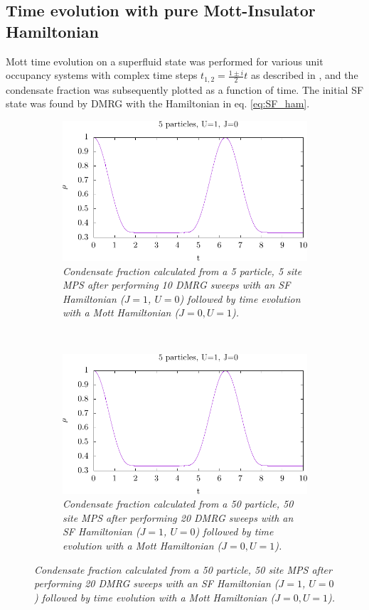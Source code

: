 \subsection{Time evolution with pure Mott-Insulator Hamiltonian}
Mott time evolution on a superfluid state was performed for various unit occupancy systems with complex time steps $t_{1,2}=\frac{1\pm i}{2}t$ as described in \cite{cmplx_t}, and the condensate fraction was subsequently plotted as a function of time. The initial SF state was found by DMRG with the Hamiltonian in eq. \ref{eq:SF_ham}.
\begin{figure}[h!]
    \centering
    \begin{subfigure}[t]{0.49\textwidth}
        \includegraphics[width=\textwidth]{Figures/TimeEvo5_U1_J0.pdf}
        \caption{\textit{Condensate fraction calculated from a 5 particle, 5 site MPS after performing 10 DMRG sweeps with an SF Hamiltonian ($J=1$, $U=0$) followed by time evolution with a Mott Hamiltonian ($J=0, U=1$).}}
        \label{fig:TimeEvo5_U1_J0}
    \end{subfigure}
    ~
    \begin{subfigure}[t]{0.49\textwidth}
        \includegraphics[width=\textwidth]{Figures/TimeEvo50_U1_J0.pdf}
        \caption{\textit{Condensate fraction calculated from a 50 particle, 50 site MPS after performing 20 DMRG sweeps with an SF Hamiltonian ($J=1$, $U=0$) followed by time evolution with a Mott Hamiltonian ($J=0, U=1$).}}
        \label{fig:TimeEvo50_U1_J0}
    \end{subfigure}    
\end{figure}
